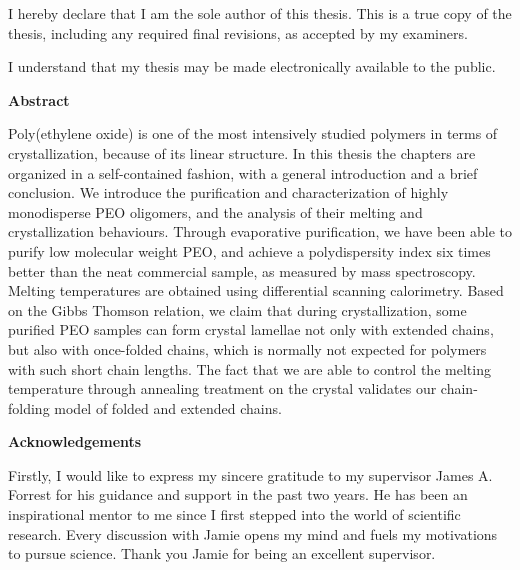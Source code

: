 \doublespacing

  \noindent
I hereby declare that I am the sole author of this thesis. This is a true copy of the thesis, including any required final revisions, as accepted by my examiners.

  \bigskip
  
  \noindent
I understand that my thesis may be made electronically available to the public.

\cleardoublepage


\begin{center}\textbf{Abstract}\end{center}

Poly(ethylene oxide) is one of the most intensively studied polymers in terms of crystallization, because of its linear structure. In this thesis the chapters are organized in a self-contained fashion, with a general introduction and a brief conclusion. We introduce the purification and characterization of highly monodisperse PEO oligomers, and the analysis of their melting and crystallization behaviours. Through evaporative purification, we have been able to purify low molecular weight PEO, and achieve a polydispersity index six times better than the neat commercial sample, as measured by mass spectroscopy. Melting temperatures are obtained using differential scanning calorimetry. Based on the Gibbs Thomson relation, we claim that during crystallization, some purified PEO samples can form crystal lamellae not only with extended chains, but also with once-folded chains, which is normally not expected for polymers with such short chain lengths. The fact that we are able to control the melting temperature through annealing treatment on the crystal validates our chain-folding model of folded and extended chains.

\cleardoublepage

\begin{center}\textbf{Acknowledgements}\end{center}

Firstly, I would like to express my sincere gratitude to my supervisor James A. Forrest for his guidance and support in the past two years. He has been an inspirational mentor to me since I first stepped into the world of scientific research. Every discussion with Jamie opens my mind and fuels my motivations to pursue science. Thank you Jamie for being an excellent supervisor.


